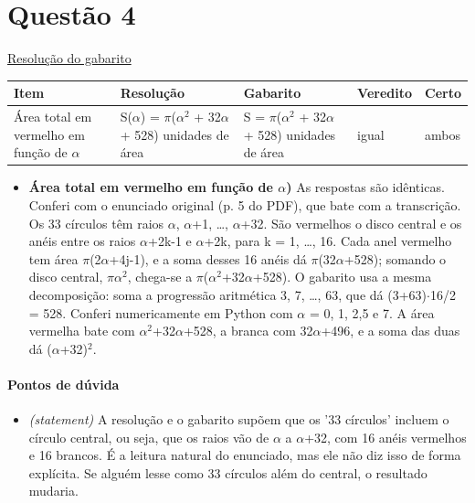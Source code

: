 \documentclass{article}%
\begin{document}
\section*{Questão 4}%
\href{https://poliedroresolve.sistemapoliedro.com.br/vestibulares/ita/2026/ita-2-fase-dia-1-28-10-2025-2-fase-dia-1/dissertativa-4-matematica-2-fase-dia-1-ita-2026}{Resolução do gabarito}\par\smallskip%
\begin{longtable}{@{}p{} p{} p{} p{} p{}@{}}\toprule Item & Resolução & Gabarito & Veredito & Certo \\ \midrule
Área total em vermelho em função de $\alpha$ & S($\alpha$) = $\pi$($\alpha$$^2$ + 32$\alpha$ + 528) unidades de área & S = $\pi$($\alpha$$^2$ + 32$\alpha$ + 528) unidades de área & igual & ambos \\
\bottomrule\end{longtable}%
\begin{itemize}%
\item%
\textbf{Área total em vermelho em função de $\alpha$)} As respostas são idênticas. Conferi com o enunciado original (p. 5 do PDF), que bate com a transcrição. Os 33 círculos têm raios $\alpha$, $\alpha$+1, \ldots{}, $\alpha$+32. São vermelhos o disco central e os anéis entre os raios $\alpha$+2k-1 e $\alpha$+2k, para k = 1, \ldots{}, 16. Cada anel vermelho tem área $\pi$(2$\alpha$+4j-1), e a soma desses 16 anéis dá $\pi$(32$\alpha$+528); somando o disco central, $\pi$$\alpha$$^2$, chega{-}se a $\pi$($\alpha$$^2$+32$\alpha$+528). O gabarito usa a mesma decomposição: soma a progressão aritmética 3, 7, \ldots{}, 63, que dá (3+63)$\cdot$16/2 = 528. Conferi numericamente em Python com $\alpha$ = 0, 1, 2,5 e 7. A área vermelha bate com $\alpha$$^2$+32$\alpha$+528, a branca com 32$\alpha$+496, e a soma das duas dá ($\alpha$+32)$^2$.%
\end{itemize}%
\paragraph{Pontos de dúvida}%
\begin{itemize}%
\item%
\textit{(statement)} A resolução e o gabarito supõem que os '33 círculos' incluem o círculo central, ou seja, que os raios vão de $\alpha$ a $\alpha$+32, com 16 anéis vermelhos e 16 brancos. É a leitura natural do enunciado, mas ele não diz isso de forma explícita. Se alguém lesse como 33 círculos além do central, o resultado mudaria.%
\end{itemize}%
\end{document}
